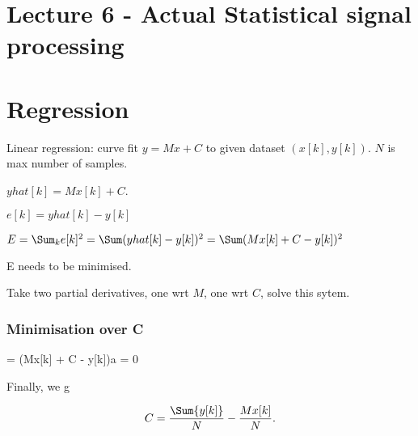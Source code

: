 \documentclass{article}
\begin{document}
\section{Lecture 6 - Actual Statistical signal processing}

\section{Regression}

Linear regression: curve fit $y = M x + C$ to given dataset $(x[k], y[k])$.
$N$ is max number of samples.

$yhat[k] = Mx[k] + C$.

$e[k] = yhat[k] - y[k]$

$ E = \Sum_k e[k]^2 = \Sum (yhat[k] - y[k])^2 = \Sum (Mx[k] + C - y[k])^2$

E needs to be minimised.

Take two partial derivatives, one wrt $M$, one wrt $C$, solve this sytem.


\subsubsection{Minimisation over C}
 = (Mx[k] + C - y[k])a = 0

Finally, we g

$$
C = \frac{\Sum{y[k]}}{N} - \frac{Mx[k]}{N}.
$$

\end{document}
